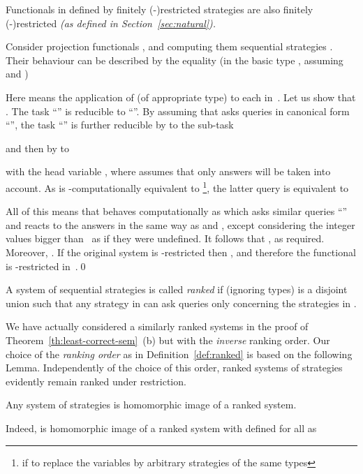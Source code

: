 \documentclass[fleqn]{LMCS}
\theoremstyle{plain}\newtheorem{satz}[thm]{Satz}
\theoremstyle{plain}\newtheorem{hyp}[thm]{Hypothesis}
\theoremstyle{plain}\newtheorem{hyps}[thm]{Hypotheses}
\theoremstyle{definition}\newtheorem{note}[thm]{Note}
\newcommand{\?}{\mbox{?}}
\begin{document}
\begin{lem}\label{lemma:finitely-restricted}
Functionals  in  defined by finitely (-)restricted
strategies are also finitely (-)restricted 
\em (as defined in Section~\ref{sec:natural}). 
\end{lem}
\proof 
Consider projection functionals ,   
and computing them sequential strategies 
. 
Their behaviour can be described by the equality (in the basic type , 
assuming  and ) 

Here  means the application of  (of appropriate type) 
to each  in~. 
Let us show that . 
The task ``''
is reducible to ``''.
By assuming that  asks queries in canonical form 
``'', 
the task ``'' is further reducible 
by  to the sub-task  

and then by  to 

with the head variable , 
where  assumes that only answers  will be taken into account. 
As  is -computationally equivalent 
to \footnote{if to replace the variables  by arbitrary strategies  
of the same types
},
the latter query is equivalent to 

All of this means that  behaves computationally as  
which asks similar queries 
``'' and reacts to the answers 
in the same way as  and , 
except considering the integer values bigger than~ as if they were undefined. 
It follows that , as required. 
Moreover, . 
If the original system is -restricted then , 
and therefore the functional  is -restricted in~.\qed










\begin{defi}\label{def:ranked}A system of sequential strategies  is called \emph{ranked} if 
(ignoring types)
 is a disjoint union 
such that any strategy
in  can ask queries only concerning the strategies in .  
\end{defi}
\noindent
We have actually considered a similarly ranked systems in the proof of 
Theorem~\ref{th:least-correct-sem}~(b) but with the \emph{inverse} ranking order. 
Our choice of the \emph{ranking order} as in Definition~\ref{def:ranked} is based  
on the following Lemma. Independently of the choice of this order, 
ranked systems of strategies evidently remain ranked under restriction. 






\begin{lem}\label{lemma:ranked}
Any system of strategies  is 
homomorphic image of a ranked system. 
\end{lem}
\proof 
Indeed,  is homomorphic image of a ranked system 
 with  defined for all  as 
\end{document}
